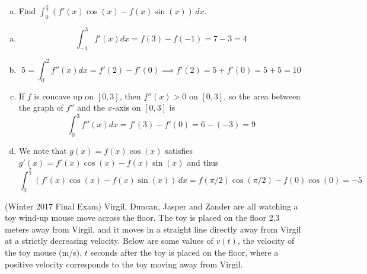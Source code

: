 \documentclass[11pt]{exam}
\begin{document}
\begin{questions}
\begin{enumerate}[(a)]
	\item Find $\displaystyle\int_0^{\frac{\pi}{2}} (f'(x)\cos(x) - f(x) \sin(x)) \, dx$.
\end{enumerate}
\begin{solution}
  \begin{enumerate}[(a)]
  \item \[
      \int_{-1}^3 f'(x) dx = f(3)-f(-1) = 7-3 = 4
    \]
  \item \[
      5 = \int_0^2 f''(x) dx = f'(2) - f'(0) \implies f'(2) = 5+f'(0)
      = 5+5 = 10
    \]
  \item If \(f\) is concave up on \([0,3]\), then \(f''(x) > 0\) on
    \([0,3]\), so the area between the graph of \(f''\) and the
    \(x\)-axis on \([0,3]\) is \[
      \int_0^3 f''(x) dx = f'(3) - f'(0) = 6 - (-3) = 9
    \]
  \item We note that \(g(x) = f(x)\cos(x)\) satisfies \(g'(x) = f'(x)
    \cos(x) - f(x)\sin(x)\) and thus \[
      \int_0^{\frac{\pi}{2}} (f'(x)\cos(x) - f(x) \sin(x)) \, dx =
      f(\pi/2)\cos(\pi/2) - f(0)\cos(0) = -5
    \]
  \end{enumerate}
\end{solution}
\pagebreak
\question (Winter 2017 Final Exam) %
	Virgil, Duncan, Jasper and Zander are all watching a toy
        wind-up mouse move across the floor. The toy is placed on the
        floor 2.3 meters away from Virgil, and it moves in a straight
        line directly away from Virgil at a strictly decreasing
        velocity. Below are some values of $v(t)$, the velocity of the
        toy mouse (m/s), $t$ seconds after the toy is placed on the
        floor, where a positive velocity corresponds to the toy moving
        away from Virgil.
        

\end{questions}
\end{document}
